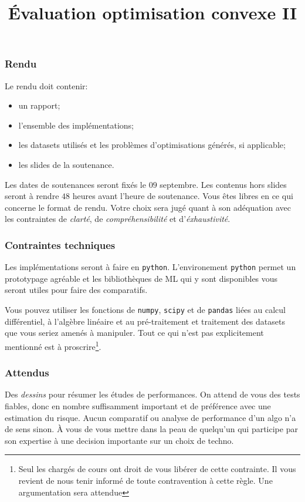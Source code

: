 \documentclass[11pt, a4paper]{article}
\title{%
  { \huge Évaluation optimisation convexe II}%
}
\author{}
\date{}
\begin{document}
\maketitle\thispagestyle{fancy}

\subsubsection*{Rendu}

Le rendu doit contenir:
\begin{itemize}
\item un rapport;
\item l'ensemble des implémentations;
\item les datasets utilisés et les problèmes d'optimisations générés, si applicable;
\item les slides de la soutenance.
\end{itemize}
Les dates de soutenances seront fixés le $09$ septembre. Les contenus
hors slides seront à rendre $48$ heures avant l'heure de
soutenance. Vous êtes libres en ce qui concerne le format de
rendu. Votre choix sera jugé quant à son adéquation avec les
contraintes de \emph{clarté}, de \emph{compréhensibilité} et
d'\emph{éxhaustivité}.

\subsubsection*{Contraintes techniques}

Les implémentations seront à faire en \texttt{python}. L'environement
\texttt{python} permet un prototypage agréable et les bibliothèques de
ML qui y sont disponibles vous seront utiles pour faire des
comparatifs.

Vous pouvez utiliser les fonctions de \texttt{numpy}, \texttt{scipy}
et de \texttt{pandas} liées au calcul différentiel, à l'algèbre
linéaire et au pré-traitement et traitement des datasets que vous
seriez amenés à manipuler. Tout ce qui n'est pas explicitement
mentionné est à proscrire\footnote{Seul les chargés de cours ont droit
  de vous libérer de cette contrainte. Il vous revient de nous tenir
  informé de toute contravention à cette règle. Une argumentation sera
  attendue}.

\subsubsection*{Attendus}

Des \emph{dessins} pour résumer les études de performances. On attend
de vous des tests fiables, donc en nombre suffisamment important et de
préférence avec une estimation du risque. Aucun comparatif ou analyse
de performance d'un algo n'a de sens sinon. À vous de vous mettre dans
la peau de quelqu'un qui participe par son expertise à une decision
importante sur un choix de techno.
\end{document}
